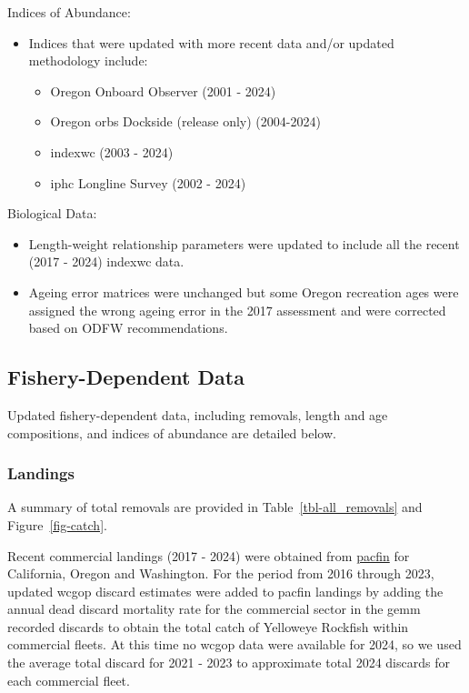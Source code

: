 \documentclass[
  english,
]{article}
\providecommand{\tightlist}{%
  \setlength{\itemsep}{0pt}\setlength{\parskip}{0pt}}
\begin{document}
Indices of Abundance:

\begin{itemize}
\tightlist
\item
  Indices that were updated with more recent data and/or updated
  methodology include:

  \begin{itemize}
  \tightlist
  \item
    Oregon Onboard Observer (2001 - 2024)
  \item
    Oregon \gls{orbs} Dockside (release only) (2004-2024)
  \item
    \gls{indexwc} (2003 - 2024)
  \item
    \gls{iphc} Longline Survey (2002 - 2024)
  \end{itemize}
\end{itemize}

Biological Data:

\begin{itemize}
\tightlist
\item
  Length-weight relationship parameters were updated to include all the
  recent (2017 - 2024) \gls{indexwc} data.
\item
  Ageing error matrices were unchanged but some Oregon recreation ages
  were assigned the wrong ageing error in the 2017 assessment and were
  corrected based on ODFW recommendations.
\end{itemize}

\subsection{Fishery-Dependent Data}\label{fishery-dependent-data}

Updated fishery-dependent data, including removals, length and age
compositions, and indices of abundance are detailed below.

\subsubsection{Landings}\label{landings}

A summary of total removals are provided in Table~\ref{tbl-all_removals}
and Figure~\ref{fig-catch}.

Recent commercial landings (2017 - 2024) were obtained from
\href{www.pacfin.psmfc.org}{\gls{pacfin}} for California, Oregon and
Washington. For the period from 2016 through 2023, updated \gls{wcgop}
discard estimates were added to \gls{pacfin} landings by adding the
annual dead discard mortality rate for the commercial sector in the
\gls{gemm} recorded discards to obtain the total catch of Yelloweye
Rockfish within commercial fleets. At this time no \gls{wcgop} data were
available for 2024, so we used the average total discard for 2021 - 2023
to approximate total 2024 discards for each commercial fleet.
\end{document}
